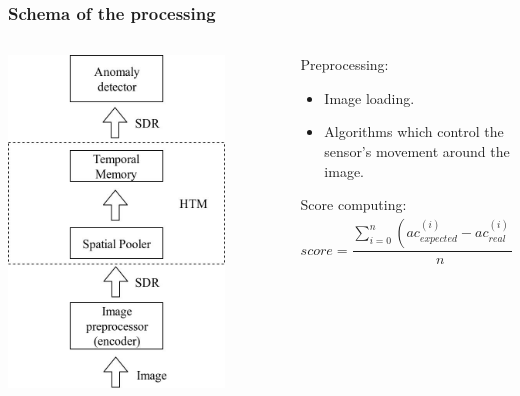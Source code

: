 \documentclass[default]{beamer}
\begin{document}
	\begin{frame}
		\frametitle{Schema of the processing}
		
		\begin{columns}
		\begin{column}{0.5\textwidth}
			\includegraphics[width=0.8\textwidth]{schema.jpg}
		\end{column}
		\begin{column}{0.5\textwidth}
			Preprocessing:
			\begin{itemize}
				\item Image loading.
				\item Algorithms which control the sensor's movement around the image.
			\end{itemize}
			Score computing:
			\[
				score = \frac{\sum_{i=0}^n \left(ac_{expected}^{(i)}-ac_{real}^{(i)}\right)^2}{n}
			\]
			\nocite{*}
			\printbibliography[keyword={osipov}, resetnumbers=true]
		\end{column}
		\end{columns}
	\end{frame}
\end{document}
